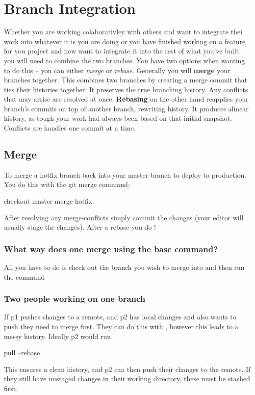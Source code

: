 \chapter{Branch Integration}
\chapteroverlayB

Whether you are working colaborativley with others and want to integrate thei work into whatever it is you are doing
or you have finished working on a feature for you project and now want to integrate it into the rest of what you've built
you will need to combine the two branches. You have two options when wanting to do this -- you can either \textit{merge} or 
\textit{rebase}. 
\newline\noindent Generally you will \textbf{merge} your branches together. This combines two branches by creating a merge commit
that ties their histories together. It preserves the true branching history. Any conflicts that may arrise are resolved at once.
\newline\noindent \textbf{Rebasing} on the other hand reapplies your branch's commits on top of another branch, rewriting history. 
It produces alinear history, as tough your work had always been based on that initial snapshot. Conflicts are handles one commit at a time.




\section{Merge}
To merge a hotfix branch back into your master branch to deploy to production. You do this with the git merge command:
\begin{gitBashBox}
checkout master
merge hotfix
\end{gitBashBox}
After resolving any merge-conflicts simply commit the changes (your editor will usually stage the changes). After a rebase you do !

\subsection{What way does one merge using the base command?}
 All you have to do is check out the branch you wish to merge into and then run the  command
 
\subsection{Two people working on one branch}
If p1 pushes changes to a remote, and p2 has local changes and also wants to push they need to merge first. They can do this with , however this leads to a messy history. Ideally p2 would run 
\begin{gitBashBox}
pull --rebase
\end{gitBashBox}
This ensures a clean history, and p2 can then push their changes to the remote. If they still have unstaged changes in their working directory, these must be stashed first.

